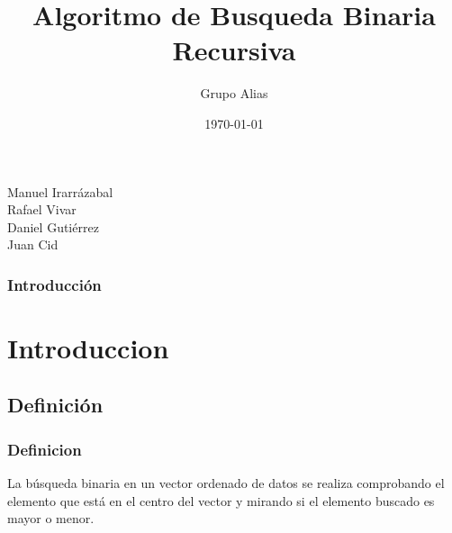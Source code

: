 \documentclass{beamer}
\title[Busqueda Binaria Recursiva]{Algoritmo de Busqueda Binaria Recursiva} %
\author{Grupo Alias} %
\institute[UTEM] %
{
Universidad Tecnológica Metropolitana\\  %
\medskip
\url{https://github.com/Lanceconan/AnalisisDeAlgoritmos} %
}
\date{\today} %
\begin{document}

\begin{frame}
	\titlepage %
\begin{center}
Manuel Irarrázabal \\  Rafael Vivar \\ Daniel Gutiérrez \\ Juan Cid
\end{center}
\end{frame}

\begin{frame}
	\frametitle{Introducción} %
	\tableofcontents %
\end{frame}


\section{Introduccion} %

	\subsection{Definición} %

		\begin{frame}
			\frametitle{Definicion}
				\begin{center}
				La búsqueda binaria en un vector ordenado de datos se realiza comprobando el elemento que está en el centro del vector y mirando si el elemento buscado es mayor o menor. 
				\end{center}
		
		\end{frame}
\end{document}
